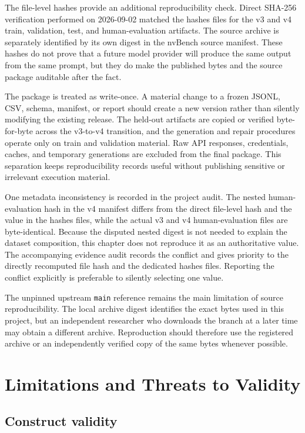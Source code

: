 The file-level hashes provide an additional reproducibility check. Direct SHA-256 verification performed on 2026-09-02 matched the hashes files for the v3 and v4 train, validation, test, and human-evaluation artifacts. The source archive is separately identified by its own digest in the nvBench source manifest. These hashes do not prove that a future model provider will produce the same output from the same prompt, but they do make the published bytes and the source package auditable after the fact.

The package is treated as write-once. A material change to a frozen JSONL, CSV, schema, manifest, or report should create a new version rather than silently modifying the existing release. The held-out artifacts are copied or verified byte-for-byte across the v3-to-v4 transition, and the generation and repair procedures operate only on train and validation material. Raw API responses, credentials, caches, and temporary generations are excluded from the final package. This separation keeps reproducibility records useful without publishing sensitive or irrelevant execution material.

One metadata inconsistency is recorded in the project audit. The nested human-evaluation hash in the v4 manifest differs from the direct file-level hash and the value in the hashes files, while the actual v3 and v4 human-evaluation files are byte-identical. Because the disputed nested digest is not needed to explain the dataset composition, this chapter does not reproduce it as an authoritative value. The accompanying evidence audit records the conflict and gives priority to the directly recomputed file hash and the dedicated hashes files. Reporting the conflict explicitly is preferable to silently selecting one value.

The unpinned upstream \texttt{main} reference remains the main limitation of source reproducibility. The local archive digest identifies the exact bytes used in this project, but an independent researcher who downloads the branch at a later time may obtain a different archive. Reproduction should therefore use the registered archive or an independently verified copy of the same bytes whenever possible.

\section{Limitations and Threats to Validity}

\subsection{Construct validity}

